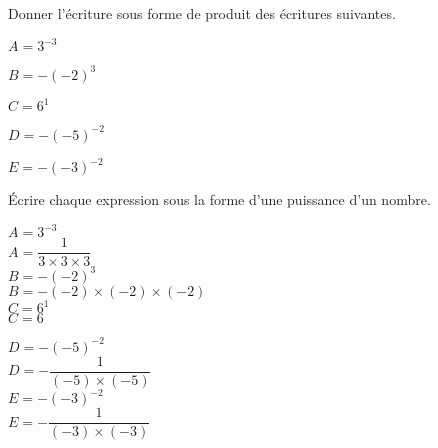 \begin{exercice*}
    Donner l'écriture sous forme de produit des écritures suivantes.
    \begin{multicols}{2}
        \begin{itemize}
            \begin{spacing}{1.5}
                \item[] $A=3^{-3}$
                \item[] $B=-(-2)^{3}$
                \item[] $C=6^{1}$
                \item[] $D=-(-5)^{-2}$
                \item[] $E=-(-3)^{-2}$
            \end{spacing}
        \end{itemize}
    \end{multicols}
\end{exercice*}
\begin{corrige}
    Écrire chaque expression sous la forme d'une puissance d'un nombre.
    \begin{spacing}{1.5}
    \begin{minipage}{0.55\linewidth}
        $A=3^{-3}$\\        
        {\red $A=\dfrac{1}{3\times3\times3}$}\\
        $B=-(-2)^{3}$\\        
        {\red $B=-(-2)\times(-2)\times(-2)$}\\
        $C=6^{1}$\\        
        {\red $C=6$}\\
    \end{minipage}
    \begin{minipage}{0.35\linewidth}
        $D=-(-5)^{-2}$\\        
        {\red $D=-\dfrac{1}{(-5)\times(-5)}$}\\
        $E=-(-3)^{-2}$\\        
        {\red $E= -\dfrac{1}{(-3)\times(-3)}$}
    \end{minipage}
    \end{spacing}
\end{corrige}
